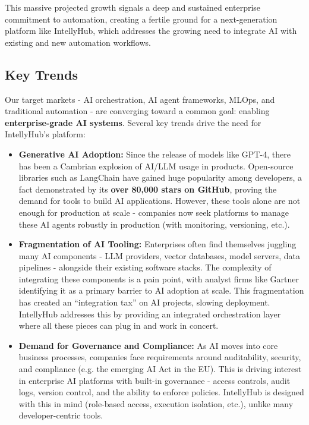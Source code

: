 \documentclass[11pt, a4paper, oneside]{article}
\begin{document}
This massive projected growth signals a deep and sustained enterprise commitment to automation, creating a fertile ground for a next-generation platform like IntellyHub, which addresses the growing need to integrate AI with existing and new automation workflows.

\subsection{Key Trends}
Our target markets - AI orchestration, AI agent frameworks, MLOps, and traditional automation - are converging toward a common goal: enabling \textbf{enterprise-grade AI systems}. Several key trends drive the need for IntellyHub's platform:

\begin{itemize}
    \item \textbf{Generative AI Adoption:} Since the release of models like GPT-4, there has been a Cambrian explosion of AI/LLM usage in products. Open-source libraries such as LangChain have gained huge popularity among developers, a fact demonstrated by its \textbf{over 80,000 stars on GitHub}\cite{langchainGitHub}, proving the demand for tools to build AI applications. However, these tools alone are not enough for production at scale - companies now seek platforms to manage these AI agents robustly in production (with monitoring, versioning, etc.). 
    
    \item \textbf{Fragmentation of AI Tooling:} Enterprises often find themselves juggling many AI components - LLM providers, vector databases, model servers, data pipelines - alongside their existing software stacks. The complexity of integrating these components is a pain point, with analyst firms like Gartner identifying it as a primary barrier to AI adoption at scale\cite{gartnerAIBarriers}. This fragmentation has created an “integration tax” on AI projects, slowing deployment. IntellyHub addresses this by providing an integrated orchestration layer where all these pieces can plug in and work in concert.
    
    \item \textbf{Demand for Governance and Compliance:} As AI moves into core business processes, companies face requirements around auditability, security, and compliance (e.g. the emerging AI Act in the EU\cite{euAIAct}). This is driving interest in enterprise AI platforms with built-in governance - access controls, audit logs, version control, and the ability to enforce policies. IntellyHub is designed with this in mind (role-based access, execution isolation, etc.), unlike many developer-centric tools.
    

\end{itemize}
\end{document}
